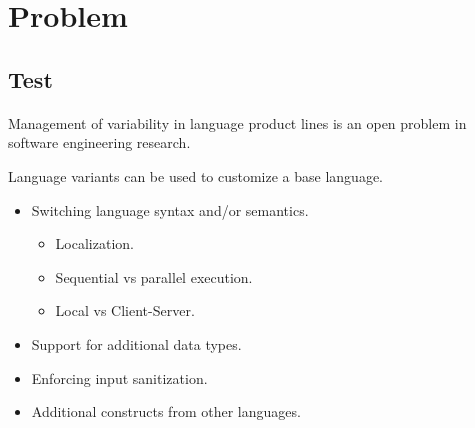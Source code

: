 \documentclass[9pt,xcolor=table,svgnames]{beamer}
\begin{document}
\section{Problem}
\subsection{Test}

\begin{frame}{\secname}
\framesubtitle{\subsecname}
    Management of {\color{BloodRed} variability} in language product lines is an open problem in software engineering research.\bigskip

    Language variants can be used to customize a base language.
    \begin{itemize}
        \item Switching language syntax and/or semantics.
            \begin{itemize}
                \item Localization.
                \item Sequential vs parallel execution.
                \item Local vs Client-Server.
            \end{itemize}
        \item Support for additional data types.
        \item Enforcing input sanitization.
        \item Additional constructs from other languages.
    \end{itemize}
\end{frame}
\end{document}
